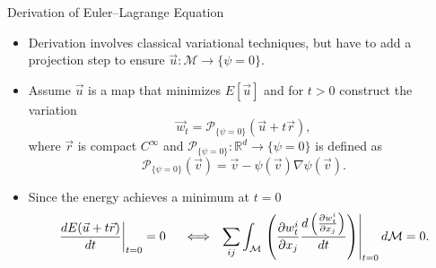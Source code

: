 \documentclass{beamer}
\begin{document}
\begin{frame}{Derivation of Euler--Lagrange Equation}
  \begin{itemize}
\item Derivation involves classical variational techniques, but have to add a projection step to ensure $\vec{u} :\mathcal{M} \rightarrow \lbrace \psi =0 \rbrace.$
\item Assume $\vec{u}$ is a map that minimizes $E[\vec{u}]$ and for $t>0$ construct the variation $$\vec{w}_t = \mathcal{P}_{\lbrace \psi = 0 \rbrace} (\vec{u} +t \vec{r}),$$ where $\vec{r}$ is compact $C^{\infty}$ and $\mathcal{P}_{\lbrace \psi = 0 \rbrace}: \mathbb{R}^d\rightarrow \lbrace \psi = 0 \rbrace$ is defined as $$\mathcal{P}_{\lbrace \psi = 0 \rbrace} (\vec{v}) = \vec{v} - \psi(\vec{v}) \nabla \psi (\vec{v}).$$
\item Since the energy achieves a minimum at $t=0$
\begin{equation*}
\left. \frac{d E(\vec{u} +t \vec{r})}{d t} \right\vert_{t=0} = 0 \hspace{0.5cm}\Longleftrightarrow \hspace{0.25cm}\sum_{ij} \int_{\mathcal{M}} \left. \left( \frac{\partial w^i_t}{\partial x_j} \frac{d\left(\frac{\partial w^i_t}{\partial x_j}\right)}{d t} \right) \right\vert_{t=0} d\mathcal{M} =0.
\end{equation*}
  \end{itemize}
\end{frame}
\end{document}
